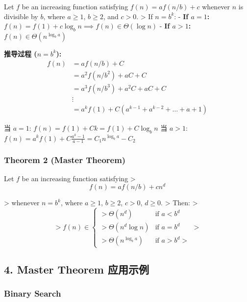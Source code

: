 \documentclass[10pt,a4paper,openany]{ctexbook}
\theoremstyle{definition}
\theoremstyle{remark}
\renewenvironment{quote}
  {\list{}{\leftmargin=1em\rightmargin=0pt\topsep=0.5pt\partopsep=0pt}\item[]}
  {\endlist}
\begin{document}
\begin{quote}
Let $f$ be an increasing function satisfying $f(n) = a f(n/b) + c$ whenever $n$ is divisible by $b$, where $a \ge 1$, $b \ge 2$, and $c > 0$.
>
If $n = b^k$:
- \textbf{If $a = 1$:} $f(n) = f(1) + c \log_b n \implies f(n) \in \Theta(\log n)$
- \textbf{If $a > 1$:} $f(n) \in \Theta(n^{\log_b a})$

\textbf{推导过程 ($n = b^k$):}
\[
\begin{aligned}
f(n) &= af(n/b) + C \\
    &= a^2 f(n/b^2) + aC + C \\
    &= a^3 f(n/b^3) + a^2 C + aC + C \\
    &\vdots \\
    &= a^k f(1) + C(a^{k-1} + a^{k-2} + \dots + a + 1)
\end{aligned}
\]


当 $a = 1$: $f(n) = f(1) + Ck = f(1) + C \log_b n$
当 $a > 1$: $f(n) = a^k f(1) + C\frac{a^k-1}{a-1} = C_1 n^{\log_b a} - C_2$

\end{quote}
\vspace{-2pt}

\subsubsection{Theorem 2 (Master Theorem)}

\begin{quote}
Let $f$ be an increasing function satisfying
>
\[
f(n) = a f(n/b) + c n^d
\]

>
whenever $n = b^k$, where $a \ge 1$, $b \ge 2$, $c > 0$, $d \ge 0$.
>
Then:
>
\[
> f(n) \in \begin{cases}
> \Theta(n^d) & \text{if } a < b^d \\
> \Theta(n^d \log n) & \text{if } a = b^d \\
> \Theta(n^{\log_b a}) & \text{if } a > b^d
> \end{cases}
> 
\]


\end{quote}
\vspace{-2pt}

\subsection{4. Master Theorem 应用示例}

\subsubsection{Binary Search}
\end{document}
